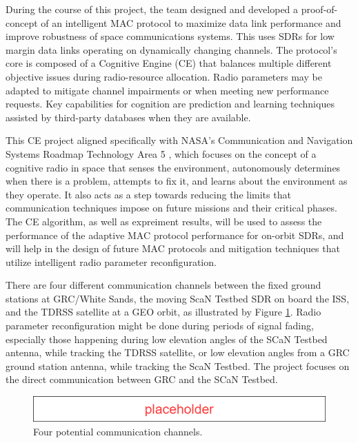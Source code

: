 	\par During the course of this project, the team designed and developed a proof-of-concept of an intelligent MAC protocol to maximize data link performance and improve robustness of space communications systems. This uses SDRs for low margin data links operating on dynamically changing channels. The protocol's core is composed of a Cognitive Engine (CE) that balances multiple different objective issues during radio-resource allocation. Radio parameters may be adapted to mitigate channel impairments or when meeting new performance requests. Key capabilities for cognition are prediction and learning techniques assisted by third-party databases when they are available.  
	\par This CE project aligned specifically with NASA's Communication and Navigation Systems Roadmap Technology Area 5 \cite{placeholderCitation}, which focuses on the concept of a cognitive radio in space that senses the environment, autonomously determines when there is a problem, attempts to fix it, and learns about the environment as they operate. It also acts as a step towards reducing the limits that communication techniques impose on future missions and their critical phases. The CE algorithm, as well as expreiment results, will be used to assess the performance of the adaptive MAC protocol performance for on-orbit SDRs, and will help in the design of future MAC protocols and mitigation techniques that utilize intelligent radio parameter reconfiguration. 
	\par There are four different communication channels between the fixed ground stations at GRC/White Sands, the moving ScaN Testbed SDR on board the ISS, and the TDRSS satellite at a GEO orbit, as illustrated by Figure \ref{fig:exampleCommChannels}. Radio parameter reconfiguration might be done during periods of signal fading, especially those happening during low elevation angles of the SCaN Testbed antenna, while tracking the TDRSS satellite, or low elevation angles from a GRC ground station antenna, while tracking the ScaN Testbed. The project focuses on the direct communication between GRC and the SCaN Testbed.
	\begin{figure}
		\centering
		\caption{Four potential communication channels.}\label{fig:exampleCommChannels}
		\includegraphics[scale=0.5]{figures/Placeholder.png}
	\end{figure}

